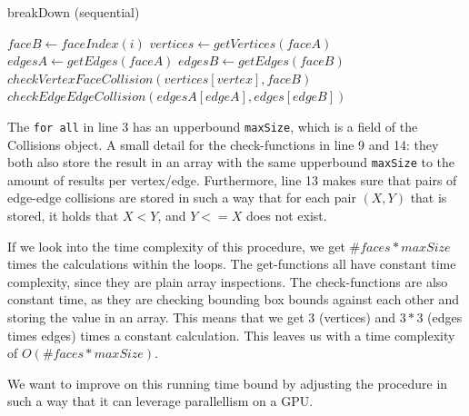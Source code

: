\begin{algorithm}
\caption{breakDown (sequential)}\label{alg:breakseq}
\begin{algorithmic}[1]
            \State $faceB \gets faceIndex(i)$ 
            \State $vertices \gets getVertices(faceA)$
            \State $edgesA \gets getEdges(faceA)$
            \State $edgesB \gets getEdges(faceB)$
                \State $checkVertexFaceCollision(vertices[vertex], faceB)$
            \EndFor
                     
                        \State $checkEdgeEdgeCollision(edgesA[edgeA], edges[edgeB])$
                    \EndIf
                \EndFor
            \EndFor
        \EndFor
    \EndFor
\EndProcedure
\end{algorithmic}
\end{algorithm}

The \texttt{for all} in line 3 has an upperbound \texttt{maxSize}, which is a field of the Collisions object. A small detail for the check-functions in line 9 and 14: they both also store the result in an array with the same upperbound \texttt{maxSize} to the amount of results per vertex/edge. Furthermore, line 13 makes sure that pairs of edge-edge collisions are stored in such a way that for each pair $(X,Y)$ that is stored, it holds that $X < Y$, and $Y <= X$ does not exist.

If we look into the time complexity of this procedure, we get $\#faces *  maxSize$ times the calculations within the loops. The get-functions all have constant time complexity, since they are plain array inspections. The check-functions are also constant time, as they are checking bounding box bounds against each other and storing the value in an array. This means that we get $3$ (vertices) and $3*3$ (edges times edges) times a constant calculation. This leaves us with a time complexity of $O(\#faces *  maxSize)$.

We want to improve on this running time bound by adjusting the procedure in such a way that it can leverage parallellism on a GPU.
